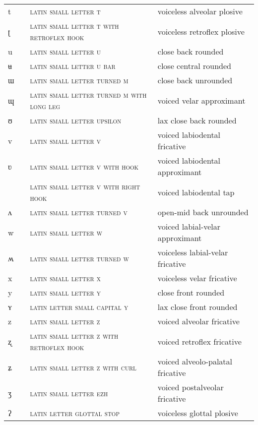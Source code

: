 \begin{center}
\begin{xtabular}{ l L{1.1cm} L{5.4cm} L{4.2cm} }
t &  & \textsc{latin small letter t} & voiceless alveolar plosive \\ 
ʈ &  & \textsc{latin small letter t with retroflex hook} & voiceless retroflex plosive \\ 
u &  & \textsc{latin small letter u} & close back rounded \\ 
ʉ &  & \textsc{latin small letter u bar} & close central rounded \\ 
ɯ &  & \textsc{latin small letter turned m} & close back unrounded \\ 
ɰ &  & \textsc{latin small letter turned m with long leg} & voiced velar approximant \\ 
ʊ &  & \textsc{latin small letter upsilon} & lax close back rounded \\ 
v &  & \textsc{latin small letter v} & voiced labiodental fricative \\ 
ʋ &  & \textsc{latin small letter v with hook} & voiced labiodental approximant \\ 
 &  & \textsc{latin small letter v with right hook} & voiced labiodental tap \\ 
ʌ &  & \textsc{latin small letter turned v} & open-mid back unrounded \\ 
w &  & \textsc{latin small letter w} & voiced labial-velar approximant \\ 
ʍ &  & \textsc{latin small letter turned w} & voiceless labial-velar fricative \\ 
x &  & \textsc{latin small letter x} & voiceless velar fricative \\ 
y &  & \textsc{latin small letter y} & close front rounded \\ 
ʏ &  & \textsc{latin letter small capital y} & lax close front rounded \\ 
z &  & \textsc{latin small letter z} & voiced alveolar fricative \\ 
ʐ &  & \textsc{latin small letter z with retroflex hook} & voiced retroflex fricative \\ 
ʑ &  & \textsc{latin small letter z with curl} & voiced alveolo-palatal fricative \\ 
ʒ &  & \textsc{latin small letter ezh} & voiced postalveolar fricative \\ 
ʔ &  & \textsc{latin letter glottal stop} & voiceless glottal plosive \\ 

\end{xtabular}
\end{center}
